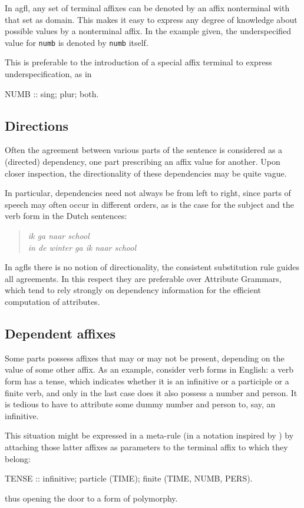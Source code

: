 In {\sc agfl}, any set of terminal affixes can be denoted by an affix nonterminal
with that set as domain. This makes it easy to express any degree of
knowledge about possible values by a nonterminal affix. In the example given,
the underspecified value for {\tt numb} is denoted by {\tt numb} itself.

This is preferable to the introduction of a special affix terminal to express
underspecification, as in
\begin{elan}
NUMB :: sing; plur; both.
\end{elan}
\subsection{Directions}
Often the agreement between various parts of the sentence is considered
as a (directed) dependency, one part prescribing an affix value for another.
Upon closer inspection, the directionality of these dependencies may be
quite vague.

In particular, dependencies need not always be from left to right,
since parts of speech may often occur in different orders, as is the case
for the subject and the verb form in the Dutch sentences:
\begin{quote}
{\sl ik ga naar school}\\
{\sl in de winter ga ik naar school}
\end{quote}
\noindent
In {\sc agfl}s there is no notion of directionality, the consistent substitution
rule guides all agreements. In this respect they are preferable over
Attribute
Grammars, which tend to rely strongly on dependency information for the
efficient computation of attributes.
\subsection{Dependent affixes}
Some parts possess affixes that may or may not be present, depending
on the value of some other affix. As an example, consider verb forms in
English: a verb form has a tense, which indicates whether it is an
infinitive or a participle or a finite verb,
and only in the last case does it also possess a number and person.
It is tedious to have to attribute some dummy number and person to,
say, an infinitive.

This situation might be expressed in a meta-rule (in a notation inspired by
\cite{l29}) by attaching those latter affixes as parameters to the terminal
affix to which they belong:
\begin{elan}
TENSE :: infinitive; particle (TIME); finite (TIME, NUMB, PERS).
\end{elan}
\noindent
thus opening the door to a form of polymorphy.

